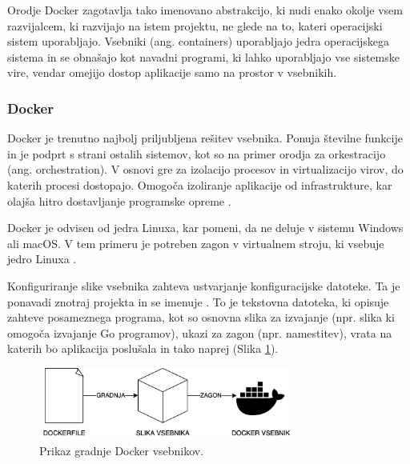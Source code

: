 \documentclass[a4paper, 12pt]{book}
\begin{document}
Orodje Docker zagotavlja tako imenovano abstrakcijo, ki nudi enako okolje vsem razvijalcem, ki razvijajo na istem projektu, ne glede na to, kateri operacijski sistem uporabljajo. Vsebniki (ang. containers) uporabljajo jedra operacijskega sistema in se obnašajo kot navadni programi, ki lahko uporabljajo vse sistemske vire, vendar omejijo dostop aplikacije samo na prostor v vsebnikih. 

\clearpage


\subsubsection{Docker}
\label{docker-section}
Docker je trenutno najbolj priljubljena rešitev vsebnika. Ponuja številne funkcije in je podprt s strani ostalih sistemov, kot so na primer orodja za orkestracijo (ang. orchestration). V osnovi gre za izolacijo procesov in virtualizacijo virov, do katerih procesi dostopajo. Omogoča izoliranje aplikacije od infrastrukture, kar olajša hitro dostavljanje programske opreme \cite{linuxcontainers}.

Docker je odvisen od jedra Linuxa, kar pomeni, da ne deluje v sistemu Windows ali macOS. V tem primeru je potreben zagon v virtualnem stroju, ki vsebuje jedro Linuxa \cite{docker-in-action}.

Konfiguriranje slike vsebnika zahteva ustvarjanje konfiguracijske datoteke. Ta je ponavadi znotraj projekta in se imenuje . To je tekstovna datoteka, ki opisuje zahteve posameznega programa, kot so osnovna slika za izvajanje (npr. slika ki omogoča izvajanje Go programov), ukazi za zagon (npr. namestitev), vrata na katerih bo aplikacija poslušala in tako naprej (Slika \ref{docker-flow}).

\begin{figure}[h]
\begin{center}
\includegraphics[width=0.75\textwidth]{slike/docker-flow.png}
\end{center}
\caption{ Prikaz gradnje Docker vsebnikov. }
\label{docker-flow}
\end{figure}
\end{document}
